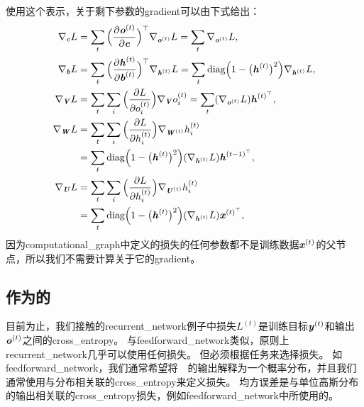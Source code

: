 使用这个表示，关于剩下参数的\gls{gradient}可以由下式给出：
\begin{align}
 \nabla_{\boldsymbol{\mathit{c}}} L &=  \sum_t \Big( \frac{\partial \boldsymbol{\mathit{o}}^{(t)}}{\partial \boldsymbol{\mathit{c}}} \Big)^\top \nabla_{\boldsymbol{\mathit{o}}^{(t)}} L 
 = \sum_t \nabla_{\boldsymbol{\mathit{o}}^{(t)}} L ,\\
 \nabla_{\boldsymbol{\mathit{b}}} L &= \sum_t \Big( \frac{\partial \boldsymbol{\mathit{h}}^{(t)}}{\partial \boldsymbol{\mathit{b}}^{(t)}} \Big)^\top \nabla_{\boldsymbol{\mathit{h}}^{(t)}} L 
 = \sum_t \text{diag} \Big( 1 - \big( \boldsymbol{\mathit{h}}^{(t)} \big)^2 \Big)  \nabla_{\boldsymbol{\mathit{h}}^{(t)}} L  ,\\
 \nabla_{\boldsymbol{\mathit{V}}} L &= \sum_t \sum_i \Big( \frac{\partial L} {\partial o_i^{(t)}}\Big) \nabla_{\boldsymbol{\mathit{V}}} o_i^{(t)} 
 = \sum_t (\nabla_{\boldsymbol{\mathit{o}}^{(t)}} L) \boldsymbol{\mathit{h}}^{(t)^\top},\\
 \nabla_{\boldsymbol{\mathit{W}}} L &= \sum_t \sum_i \Big( \frac{\partial L} {\partial h_i^{(t)}}\Big) 
 \nabla_{\boldsymbol{\mathit{W}}^{(t)}} h_i^{(t)} \\
&= \sum_t \text{diag} \Big( 1 - \big( \boldsymbol{\mathit{h}}^{(t)} \big)^2 \Big) ( \nabla_{\boldsymbol{\mathit{h}}^{(t)}} L) \boldsymbol{\mathit{h}}^{(t-1)^\top} ,\\
 \nabla_{\boldsymbol{\mathit{U}}} L &= \sum_t \sum_i \Big( \frac{\partial L} {\partial h_i^{(t)}}\Big) 
 \nabla_{\boldsymbol{\mathit{U}}^{(t)}} h_i^{(t)} \\
&= \sum_t \text{diag} \Big( 1 - \big( \boldsymbol{\mathit{h}}^{(t)} \big)^2 \Big) ( \nabla_{\boldsymbol{\mathit{h}}^{(t)}} L) \boldsymbol{\mathit{x}}^{(t)^\top} ,
\end{align}
因为\gls{computational_graph}中定义的损失的任何参数都不是训练数据$\boldsymbol{\mathit{x}}^{(t)}$的父节点，所以我们不需要计算关于它的\gls{gradient}。


\subsection{作为的}
\label{sec:recurrent_networks_as_directed_graphical_models}
目前为止，我们接触的\gls{recurrent_network}例子中损失$L^{(t)}$是训练目标$\boldsymbol{\mathit{y}}^{(t)}$和输出$\boldsymbol{\mathit{o}}^{(t)}$之间的\gls{cross_entropy}。
与\gls{feedforward_network}类似，原则上\gls{recurrent_network}几乎可以使用任何损失。
但必须根据任务来选择损失。
如\gls{feedforward_network}，我们通常希望将~~的输出解释为一个概率分布，并且我们通常使用与分布相关联的\gls{cross_entropy}来定义损失。
均方误差是与单位高斯分布的输出相关联的\gls{cross_entropy}损失，例如\gls{feedforward_network}中所使用的。

